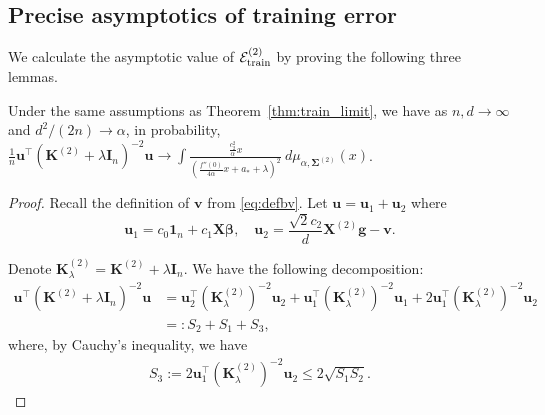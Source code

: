 \documentclass[twoside,11pt]{article}
\def\bI{{\mathbf I}}
\def\bK{{\boldsymbol K}}
\def\bX{{\boldsymbol X}}
\def\bg{{\boldsymbol g}}
\def\bu{{\boldsymbol u}}
\def\bv{{\boldsymbol v}}
\def\bbeta{{\boldsymbol \beta}}
\def\bSigma{{\boldsymbol \Sigma}}
\def\cE{{\mathcal E}}
\renewcommand{\bK}{\boldsymbol{K}}
\newcommand{\Etrain}{\cE_{\textnormal{train}}}
\newcommand{\1}{\mathbf{1}}
\begin{document}
\subsection{Precise asymptotics of training error}

We calculate the asymptotic value of $\Etrain^{(2)}$ by proving the following three lemmas.
\begin{lemma}\label{lem:train1}
Under the same assumptions as Theorem~\ref{thm:train_limit},  we have as $n,d\to\infty$ and $d^2/(2n)\to \alpha$,    in probability,
    $ \frac{1}{n}\bu^\top (\bK^{(2)} +\lambda\bI_n)^{-2}\bu \to \int \frac{\frac{c_2^2}{\alpha} x}{\left(\frac{f''(0)}{4\alpha}x+a_*+\lambda\right)^2}~d\mu_{\alpha,\bSigma^{(2)}}(x)$.
\end{lemma}
\begin{proof}
 Recall the definition of $\bv$ from \eqref{eq:defbv}.
 Let $\bu=\bu_1+\bu_2$ where 
    \[ \bu_1=c_0\1_n+c_1 \bX\bbeta, \quad \bu_2=\frac{\sqrt{2}c_2}{d}\bX^{(2)}\bg-\bv.\]


    
    Denote $\bK_{\lambda}^{(2)}=\bK^{(2)} +\lambda\bI_n$. We have the following decomposition:
       \begin{align}
          \bu^\top(\bK^{(2)} +\lambda\bI_n)^{-2}\bu&=\bu_2^\top \left( \bK_{\lambda}^{(2)}\right)^{-2}\bu_2+ \bu_1^\top \left( \bK_{\lambda}^{(2)}\right)^{-2}\bu_1+ 2\bu_1^\top \left( \bK_{\lambda}^{(2)}\right)^{-2}\bu_2 \\
           &=:S_2+S_1+ S_3, \label{eq:S1S2S3}
       \end{align}
       where, by Cauchy's inequality, we have
       \begin{align} \label{eq:S3cauchy}
       S_3:=2\bu_1^\top \left( \bK_{\lambda}^{(2)}\right)^{-2}\bu_2 \leq 2\sqrt{S_1S_2}.
       \end{align}

 



\end{proof}
\end{document}
